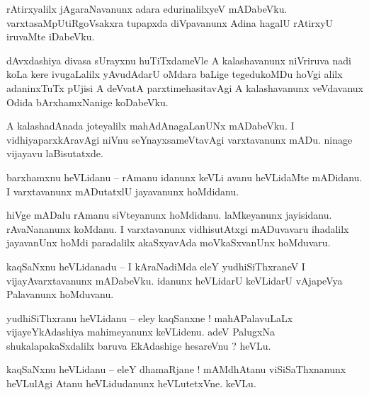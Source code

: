 \documentclass{article}
\begin{document}
\begin{mn}%
rAtirxyalilx jAgaraNavanunx adara edurinalilxyeV mADabeVku. varxtasaMpUtiRgoVsakxra tupapxda 
diVpavanunx Adina hagalU rAtirxyU iruvaMte iDabeVku.
\end{mn}

\begin{mn}%
dAvxdashiya divasa sUrayxnu huTiTxdameVle A kalashavanunx niVriruva nadi koLa kere ivugaLalilx 
yAvudAdarU oMdara baLige tegedukoMDu hoVgi alilx adaninxTuTx pUjisi A deVvatA parxtimehasitavAgi A 
kalashavanunx veVdavanux Odida bArxhamxNanige koDabeVku.
\end{mn}

\begin{mn}%
A kalashadAnada joteyalilx mahAdAnagaLanUNx mADabeVku. I vidhiyaparxkAravAgi niVnu 
seYnayxsameVtavAgi varxtavanunx mADu. ninage vijayavu laBisutatxde.
\end{mn}

\begin{mn}%
barxhamxnu heVLidanu -- rAmanu idanunx keVLi avanu heVLidaMte mADidanu. I varxtavanunx mADutatxlU 
jayavanunx hoMdidanu.
\end{mn}

\begin{mn}%
hiVge mADalu rAmanu siVteyanunx hoMdidanu. laMkeyanunx jayisidanu. rAvaNananunx koMdanu. I 
varxtavanunx vidhisutAtxgi mADuvavaru ihadalilx jayavanUnx hoMdi paradalilx akaSxyavAda 
moVkaSxvanUnx hoMduvaru.
\end{mn}

\begin{mn}%
kaqSaNxnu heVLidanadu -- I kAraNadiMda eleY yudhiSiThxraneV I vijayAvarxtavanunx mADabeVku. idanunx 
heVLidarU keVLidarU vAjapeVya Palavanunx hoMduvanu.
\end{mn}


\begin{mn}%
yudhiSiThxranu heVLidanu -- eley kaqSanxne ! mahAPalavuLaLx vijayeYkAdashiya mahimeyanunx 
keVLidenu. adeV PalugxNa shukalapakaSxdalilx baruva EkAdashige hesareVnu ? heVLu.
\end{mn}

\begin{mn}%
kaqSaNxnu heVLidanu -- eleY dhamaRjane ! mAMdhAtanu viSiSaThxnanunx heVLulAgi Atanu heVLidudanunx 
heVLutetxVne. keVLu.
\end{mn}
\end{document}
